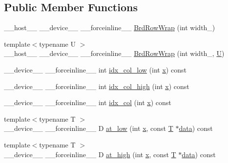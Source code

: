 \subsection*{Public Member Functions}
\begin{DoxyCompactItemize}
\item 
\-\_\-\-\_\-host\-\_\-\-\_\- \-\_\-\-\_\-device\-\_\-\-\_\- \-\_\-\-\_\-forceinline\-\_\-\-\_\- \hyperlink{structcv_1_1gpu_1_1device_1_1BrdRowWrap_ad13b23a3c9142d5d5388424d676ad47c}{Brd\-Row\-Wrap} (int width\-\_\-)
\item 
{\footnotesize template$<$typename U $>$ }\\\-\_\-\-\_\-host\-\_\-\-\_\- \-\_\-\-\_\-device\-\_\-\-\_\- \-\_\-\-\_\-forceinline\-\_\-\-\_\- \hyperlink{structcv_1_1gpu_1_1device_1_1BrdRowWrap_ae3a0449c739abfaa4ebf148f2f43a9df}{Brd\-Row\-Wrap} (int width\-\_\-, \hyperlink{core__c_8h_aa9c521f41af9a5191e5e4b6ffbae211a}{U})
\item 
\-\_\-\-\_\-device\-\_\-\-\_\- \-\_\-\-\_\-forceinline\-\_\-\-\_\- int \hyperlink{structcv_1_1gpu_1_1device_1_1BrdRowWrap_a718ab3edbcdaf24d76255fbb5388cfd8}{idx\-\_\-col\-\_\-low} (int \hyperlink{highgui__c_8h_a6150e0515f7202e2fb518f7206ed97dc}{x}) const 
\item 
\-\_\-\-\_\-device\-\_\-\-\_\- \-\_\-\-\_\-forceinline\-\_\-\-\_\- int \hyperlink{structcv_1_1gpu_1_1device_1_1BrdRowWrap_ab9e43b8296792a2438a46943ae13667a}{idx\-\_\-col\-\_\-high} (int \hyperlink{highgui__c_8h_a6150e0515f7202e2fb518f7206ed97dc}{x}) const 
\item 
\-\_\-\-\_\-device\-\_\-\-\_\- \-\_\-\-\_\-forceinline\-\_\-\-\_\- int \hyperlink{structcv_1_1gpu_1_1device_1_1BrdRowWrap_ad7c1f8badfbcbf8ef7c6331e258f183c}{idx\-\_\-col} (int \hyperlink{highgui__c_8h_a6150e0515f7202e2fb518f7206ed97dc}{x}) const 
\item 
{\footnotesize template$<$typename T $>$ }\\\-\_\-\-\_\-device\-\_\-\-\_\- \-\_\-\-\_\-forceinline\-\_\-\-\_\- D \hyperlink{structcv_1_1gpu_1_1device_1_1BrdRowWrap_aa3bb3baa8eabe9786fecce96bfdf0318}{at\-\_\-low} (int \hyperlink{highgui__c_8h_a6150e0515f7202e2fb518f7206ed97dc}{x}, const \hyperlink{calib3d_8hpp_a3efb9551a871ddd0463079a808916717}{T} $\ast$\hyperlink{legacy_8hpp_ab9fe6c09e6d02865a953fffc12fe6ca0}{data}) const 
\item 
{\footnotesize template$<$typename T $>$ }\\\-\_\-\-\_\-device\-\_\-\-\_\- \-\_\-\-\_\-forceinline\-\_\-\-\_\- D \hyperlink{structcv_1_1gpu_1_1device_1_1BrdRowWrap_a6001019cee0512786e59b158828b8212}{at\-\_\-high} (int \hyperlink{highgui__c_8h_a6150e0515f7202e2fb518f7206ed97dc}{x}, const \hyperlink{calib3d_8hpp_a3efb9551a871ddd0463079a808916717}{T} $\ast$\hyperlink{legacy_8hpp_ab9fe6c09e6d02865a953fffc12fe6ca0}{data}) const 

\end{DoxyCompactItemize}
